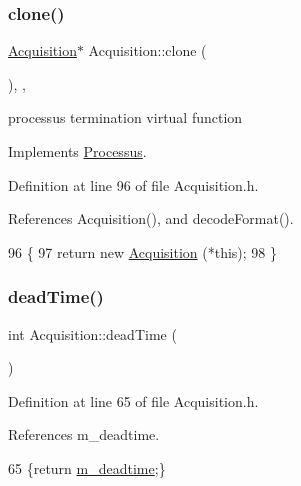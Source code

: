 \subsubsection{\texorpdfstring{clone()}{clone()}\hspace{0.1cm}{\footnotesize\ttfamily [2/2]}}
{\footnotesize\ttfamily \hyperlink{classAcquisition_1_1Acquisition}{Acquisition}$\ast$ Acquisition\+::clone (\begin{DoxyParamCaption}{ }\end{DoxyParamCaption})\hspace{0.3cm}{\ttfamily [inline]}, {\ttfamily [protected]}, {\ttfamily [virtual]}}

processus termination virtual function 

Implements \hyperlink{classProcessus_aca8856f6d6d7b7e1fe941f298dcbb502}{Processus}.



Definition at line 96 of file Acquisition.\+h.



References Acquisition(), and decode\+Format().


\begin{DoxyCode}
96                       \{
97     \textcolor{keywordflow}{return} \textcolor{keyword}{new} \hyperlink{classAcquisition_aa7d3138495a4a8888c21b33f4d657732}{Acquisition} (*\textcolor{keyword}{this});
98   \}
\end{DoxyCode}
\mbox{\label{classAcquisition_a8fb2cd60a34993ab0952d719a8517831}} 
\subsubsection{\texorpdfstring{dead\+Time()}{deadTime()}\hspace{0.1cm}{\footnotesize\ttfamily [1/2]}}
{\footnotesize\ttfamily int Acquisition\+::dead\+Time (\begin{DoxyParamCaption}{ }\end{DoxyParamCaption})\hspace{0.3cm}{\ttfamily [inline]}}



Definition at line 65 of file Acquisition.\+h.



References m\+\_\+deadtime.


\begin{DoxyCode}
65 \{\textcolor{keywordflow}{return} \hyperlink{classAcquisition_a5f7fe20506e7d860ed61935255adfe17}{m\_deadtime};\}
\end{DoxyCode}
\mbox{\label{classAcquisition_a8fb2cd60a34993ab0952d719a8517831}} 
